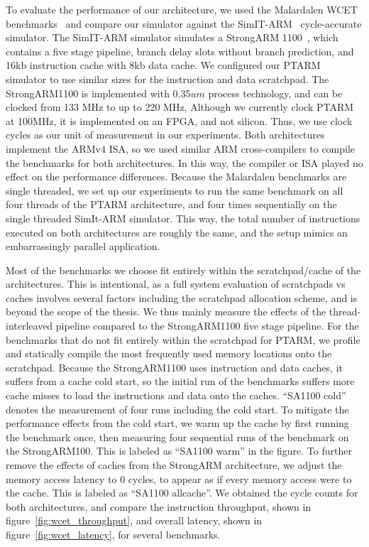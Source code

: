 To evaluate the performance of our architecture, we used the Malardalen WCET benchmarks~\cite{Gustafsson:WCET2010:Benchmarks} and compare our simulator against the SimIT-ARM~\cite{Qin:2003:FFM:789083.1022785} cycle-accurate simulator.
The SimIT-ARM simulator simulates a StrongARM 1100~\cite{intel-sa-1100}, which contains a five stage pipeline, branch delay slots without branch prediction, and 16kb instruction cache with 8kb data cache.
We configured our PTARM simulator to use similar sizes for the instruction and data scratchpad.
The StrongARM1100 is implemented with 0.35$um$ process technology, and can be clocked from 133 MHz to up to 220 MHz, 
Although we currently clock PTARM at 100MHz, it is implemented on an FPGA, and not silicon. 
Thus, we use clock cycles as our unit of measurement in our experiments.     
Both architectures implement the ARMv4 ISA, so we used similar ARM cross-compilers to compile the benchmarks for both architectures.
In this way, the compiler or ISA played no effect on the performance differences.
Because the Malardalen benchmarks are single threaded, we set up our experiments to run the same benchmark on all four threads of the PTARM architecture, and four times sequentially on the single threaded SimIt-ARM simulator.
This way, the total number of instructions executed on both architectures are roughly the same, and the setup mimics an embarrassingly parallel application.   

Most of the benchmarks we choose fit entirely within the scratchpad/cache of the architectures.
This is intentional, as a full system evaluation of scratchpads vs caches involves several factors including the scratchpad allocation scheme, and is beyond the scope of the thesis.
We thus mainly measure the effects of the thread-interleaved pipeline compared to the StrongARM1100 five stage pipeline. 
For the benchmarks that do not fit entirely within the scratchpad for PTARM, we profile and statically compile the most frequently used memory locations onto the scratchpad.
Because the StrongARM1100 uses instruction and data caches, it suffers from a cache cold start, so the initial run of the benchmarks suffers more cache misses to load the instructions and data onto the caches. 
``SA1100 cold'' denotes the measurement of four runs including the cold start.  
To mitigate the performance effects from the cold start, we warm up the cache by first running the benchmark once, then measuring four sequential runs of the benchmark on the StrongARM100.  
This is labeled as ``SA1100 warm'' in the figure. 
To further remove the effects of caches from the StrongARM architecture, we adjust the memory access latency to 0 cycles, to appear as if every memory access were to the cache. 
This is labeled as ``SA1100 allcache''.
We obtained the cycle counts for both architectures, and compare the instruction throughput, shown in figure~\ref{fig:wcet_throughput}, and overall latency, shown in figure~\ref{fig:wcet_latency}, for several benchmarks.


